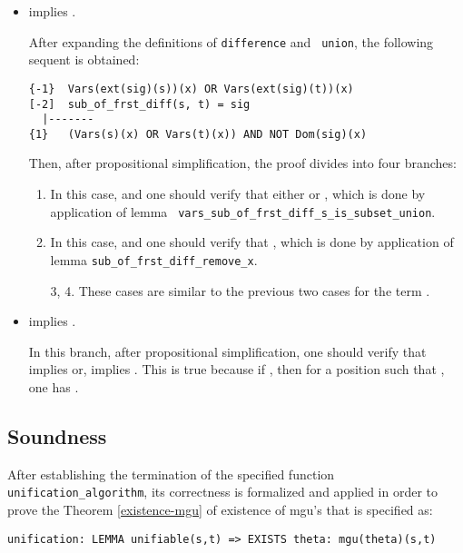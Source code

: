 \documentclass[submission,copyright,creativecommons]{eptcs}
\begin{document}
  \begin{itemize}

  \item  implies
    .

    After expanding the definitions of {\tt difference} and {\tt
      union}, the following sequent is obtained:

    {\small
\begin{verbatim}
{-1}  Vars(ext(sig)(s))(x) OR Vars(ext(sig)(t))(x)
[-2]  sub_of_frst_diff(s, t) = sig
  |-------
{1}   (Vars(s)(x) OR Vars(t)(x)) AND NOT Dom(sig)(x)
\end{verbatim}
    }

    Then, after propositional simplification, the proof divides into
    four branches:

    \begin{enumerate}

    \item In this case,  and one should
      verify that either  or , which is
      done by application of lemma {\tt
        vars\_\-sub\_\-of\_\-frst\_\-diff\_s\_\-is\_\-subset\_\-union}.

    \item In this case,  and one should
      verify that , which is done by application
      of lemma {\tt sub\_of\_frst\_diff\_remove\_x}.

    \item[3, 4.] These cases are similar to the previous two cases for
      the term .

    \end{enumerate}

  \item  implies .

    In this branch, after propositional simplification, one should
    verify that  implies 
    or,  implies . This is
    true because if , then for a position  such that , one has
    .

  \end{itemize}


\subsection{Soundness}
After establishing the termination of the specified function {\tt
  unification\_algorithm}, its correctness is formalized and applied
in order to prove the Theorem \ref{existence-mgu} of existence of
mgu's that is specified as:

{\small
\begin{verbatim}
unification: LEMMA unifiable(s,t) => EXISTS theta: mgu(theta)(s,t)
\end{verbatim}
}
\end{document}
